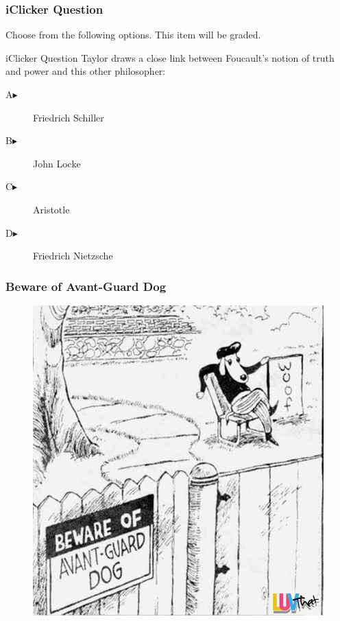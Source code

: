 \documentclass[xcolor=dvipsnames]{beamer}
\begin{document}
\begin{frame}
  \frametitle{iClicker Question}
Choose from the following options. This item will be graded.
\begin{block}{iClicker Question}
  Taylor draws a close link between Foucault's notion of truth and
  power and this other philosopher:
\end{block}
\begin{description}
\item[A\hspace{.2in}$\blacktriangleright$] Friedrich Schiller
\item[B\hspace{.2in}$\blacktriangleright$] John Locke
\item[C\hspace{.2in}$\blacktriangleright$] Aristotle
\item[D\hspace{.2in}$\blacktriangleright$] Friedrich Nietzsche
\end{description}
\end{frame}

\begin{frame}
  \frametitle{Beware of Avant-Guard Dog}
  \begin{figure}[h]
    \includegraphics[scale=0.28]{./BewareTheAvantGuardDog.jpg}
  \end{figure}
\end{frame}
\end{document}
